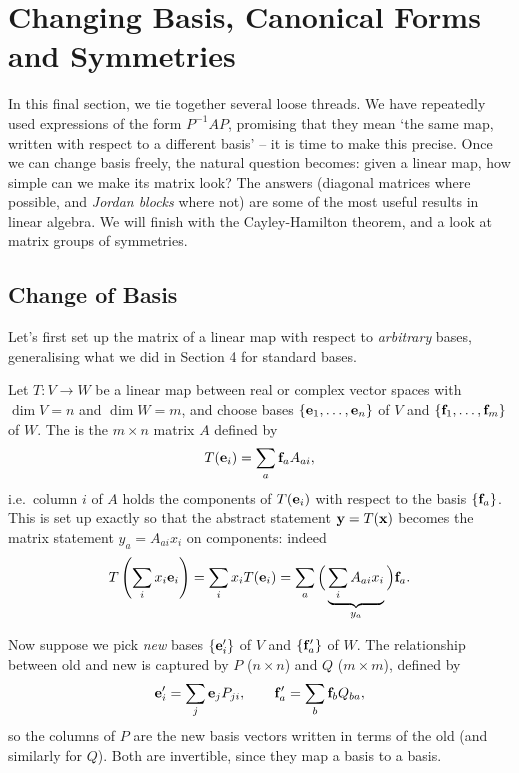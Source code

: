 \documentclass[a4paper]{scrartcl}
\begin{document}
\section{Changing Basis, Canonical Forms and Symmetries}

In this final section, we tie together several loose threads. We have repeatedly used expressions of the form $P^{-1}AP$, promising that they mean `the same map, written with respect to a different basis' -- it is time to make this precise. Once we can change basis freely, the natural question becomes: given a linear map, how simple can we make its matrix look? The answers (diagonal matrices where possible, and \emph{Jordan blocks} where not) are some of the most useful results in linear algebra. We will finish with the Cayley-Hamilton theorem, and a look at matrix groups of symmetries.

\subsection{Change of Basis}

Let's first set up the matrix of a linear map with respect to \emph{arbitrary} bases, generalising what we did in Section 4 for standard bases.

Let $T : V \rightarrow W$ be a linear map between real or complex vector spaces with $\dim V = n$ and $\dim W = m$, and choose bases $\{\mathbf{e}_1, \dots, \mathbf{e}_n\}$ of $V$ and $\{\mathbf{f}_1, \dots, \mathbf{f}_m\}$ of $W$. The  is the $m \times n$ matrix $A$ defined by
$$
T(\mathbf{e}_i) = \sum_{a} \mathbf{f}_a A_{ai},
$$
i.e.\ column $i$ of $A$ holds the components of $T(\mathbf{e}_i)$ with respect to the basis $\{\mathbf{f}_a\}$. This is set up exactly so that the abstract statement $\mathbf{y} = T(\mathbf{x})$ becomes the matrix statement $y_a = A_{ai}x_i$ on components: indeed
$$
T\left(\sum_i x_i \mathbf{e}_i\right) = \sum_i x_i T(\mathbf{e}_i) = \sum_a \Big(\underbrace{\sum_i A_{ai}x_i}_{y_a}\Big) \mathbf{f}_a.
$$

Now suppose we pick \emph{new} bases $\{\mathbf{e}_i'\}$ of $V$ and $\{\mathbf{f}_a'\}$ of $W$. The relationship between old and new is captured by  $P$ ($n \times n$) and $Q$ ($m \times m$), defined by
$$
\mathbf{e}_i' = \sum_j \mathbf{e}_j P_{ji}, \quad \quad \mathbf{f}_a' = \sum_b \mathbf{f}_b Q_{ba},
$$
so the columns of $P$ are the new basis vectors written in terms of the old (and similarly for $Q$). Both are invertible, since they map a basis to a basis.
\end{document}
